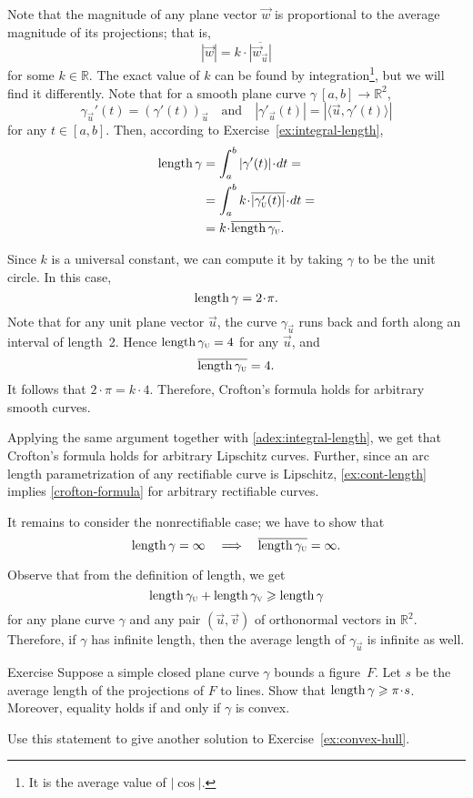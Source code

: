 Note that the magnitude of any plane vector ${\vec w}$ is proportional to the average magnitude of its projections; that is,
\[|{\vec w}|=k\cdot \overline{|{\vec w}_{\vec u}|}\]
for some $k \in \mathbb{R}$.
The exact value of $k$ can be found by integration\footnote{It is the average value of $|\cos|$.}, but we will find it differently. 
Note that for a smooth plane curve $\gamma\:[a,b]\to\mathbb{R}^2$,
\[\gamma_{\vec u}'(t)=(\gamma'(t))_{\vec u}
\quad\text{and}\quad
|\gamma'_{\vec u}(t)|=|\langle\vec u,\gamma'(t)\rangle|\]
for any $t \in [a,b]$. Then, according to Exercise~\ref{ex:integral-length},
\begin{align*}
\length\gamma
&=\int_a^b|\gamma'(t)|\cdot dt=
\\
&=\int_a^b  k\cdot \overline{|\gamma_{\vec u}'(t)|}\cdot dt=
\\
&=k\cdot \overline{\length\gamma_{\vec u}}.
\end{align*}

Since $k$ is a universal constant, we can compute it by taking $\gamma$ to be the unit circle.
In this case,
\[\length \gamma=2\cdot\pi.\]
Note that for any unit plane vector ${\vec u}$, the curve $\gamma_{\vec u}$ runs back and forth along an interval of length~2.
Hence $\mathop{\rm length}\nolimits\gamma_{\text{\sc{u}}}=4$ for any $\vec u$, and 
\[\overline{\mathop{\rm length}\nolimits\gamma_{\text{\sc{u}}}} =4.\]
It follows that $2\cdot \pi =k\cdot 4$.
Therefore, Crofton's formula holds for arbitrary smooth curves.

Applying the same argument together with \ref{adex:integral-length}, we get that Crofton's formula holds for arbitrary Lipschitz curves.
Further, since an arc length parametrization of any rectifiable curve is Lipschitz, \ref{ex:cont-length} implies \ref{crofton-formula} for arbitrary rectifiable curves.

It remains to consider the nonrectifiable case;
we have to show that 
\[\mathop{\rm length}\nolimits\gamma=\infty
\quad\Longrightarrow\quad
\overline{\mathop{\rm length}\nolimits\gamma_{\text{\sc{u}}}}=\infty.
\]

Observe that from the definition of length, we get
\[\mathop{\rm length}\nolimits\gamma_{\text{\sc{u}}}+\mathop{\rm length}\nolimits\gamma_{\text{\sc{v}}}\geqslant \mathop{\rm length}\nolimits\gamma\]
for any plane curve $\gamma$ and any pair $(\vec u , \vec v )$ of orthonormal vectors in $\mathbb{R}^2$.
Therefore, if $\gamma$ has infinite length, then the average length of $\gamma_{\vec u}$ is infinite as well.
\qeds

\begin{thm}{Exercise}\label{ex:convex-croftons}
Suppose a simple closed plane curve $\gamma$ bounds a figure~$F$.
Let $s$ be the average length of the projections of $F$ to lines.
Show that $\length\gamma\ge \pi \cdot s$.
Moreover, equality holds if and only if $\gamma$ is convex.

Use this statement to give another solution to Exercise~\ref{ex:convex-hull}.
\end{thm}

